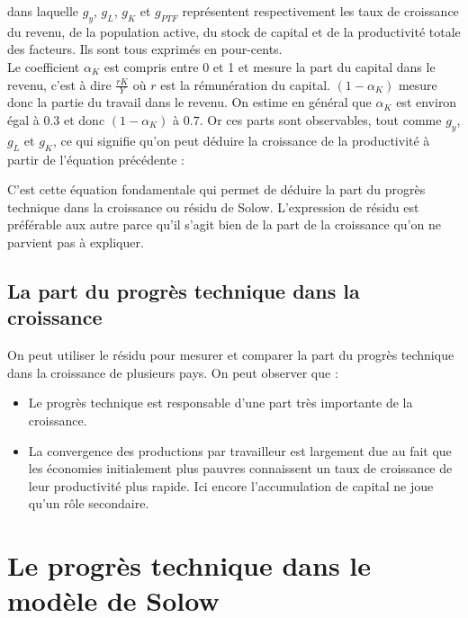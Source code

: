 \documentclass[10pt]{book}
\begin{document}
dans laquelle $g_y$, $g_L$, $g_K$ et $g_{PTF}$ représentent respectivement les taux de croissance du revenu, de la population active, du stock de capital et de la productivité totale des facteurs. Ils sont tous exprimés en pour-cents. \\
Le coefficient $\alpha_K$ est compris entre 0 et 1 et mesure la part du capital dans le revenu, c'est à dire $\frac{rK}{Y}$ où $r$ est la rémunération du capital. $(1-\alpha_K)$ mesure donc la partie du travail dans le revenu. On estime en général que $\alpha_K$ est environ égal à $0.3$ et donc $(1-\alpha_K)$ à $0.7$. Or ces parts sont observables, tout comme $g_y$, $g_L$ et $g_K$, ce qui signifie qu'on peut déduire la croissance de la productivité à partir de l'équation précédente : 
\begin{center}
\end{center}
C'est cette équation fondamentale qui permet de déduire la part du progrès technique dans la croissance ou résidu de Solow. L'expression de résidu est préférable aux autre parce qu'il s'agit bien de la part de la croissance qu'on ne parvient pas à expliquer.
\subsection{La part du progrès technique dans la croissance}
On peut utiliser le résidu pour mesurer et comparer la part du progrès technique dans la croissance de plusieurs pays. On peut observer que : 
\begin{itemize}
  \item Le progrès technique est responsable d'une part très importante de la croissance.
  \item La convergence des productions par travailleur est largement due au fait que les économies initialement plus pauvres connaissent un taux de croissance de leur productivité plus rapide. Ici encore l'accumulation de capital ne joue qu'un rôle secondaire.
\end{itemize}
\section{Le progrès technique dans le modèle de Solow}
\end{document}
